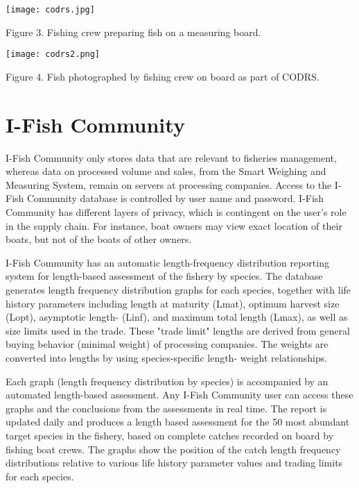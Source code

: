 \begin{center}
\graphicspath{{/root/R-project/IFishSnapperWPP718/Images/}}
\texttt{[image: codrs.jpg]}

Figure 3. Fishing crew preparing fish on a measuring board.
\end{center}

\begin{center}
\graphicspath{{/root/R-project/IFishSnapperWPP718/Images/}}
\texttt{[image: codrs2.png]}

Figure 4. Fish photographed by fishing crew on board as part of CODRS.
\end{center}

\clearpage
\newpage

\section{I-Fish Community}

I-Fish Community only stores data that are relevant to fisheries management, whereas data on processed volume and sales, from the Smart Weighing and Measuring System, remain on servers at processing companies. Access to the I-Fish Community database is controlled by user name and password. I-Fish Community has different layers of privacy, which is contingent on the user's role in the supply chain. For instance, boat owners may view exact location of their boats, but not of the boats of other owners.

I-Fish Community has an automatic length-frequency distribution reporting system for length-based assessment of the fishery by species. The database generates length frequency distribution graphs for each species, together with life history parameters including length at maturity (Lmat), optimum harvest size (Lopt), asymptotic length- (Linf), and maximum total length (Lmax), as well as size limits used in the trade. These "trade limit" lengths are derived from general buying behavior (minimal weight) of processing companies. The weights are converted into lengths by using species-specific length- weight relationships.

Each graph (length frequency distribution by species) is accompanied by an automated length-based assessment. Any I-Fish Community user can access these graphs and the conclusions from the assessments in real time. The report is updated daily and produces a length based assessment for the 50 most abundant target species in the fishery, based on complete catches recorded on board by fishing boat crews. The graphs show the position of the catch length frequency distributions relative to various life history parameter values and trading limits for each species.

